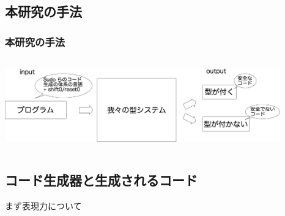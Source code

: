 \subsection{本研究の手法}
\begin{frame}
  \frametitle{本研究の手法}
  \begin{columns}
    \begin{column}{1.\textwidth}%
      \center
      \includegraphics[clip,height=3.2cm]{./img/code_s0r0.png}
    \end{column}
  \end{columns}
\end{frame}



\subsection{コード生成器と生成されるコード}

\begin{frame}
  \center
  \huge{まず表現力について}
\end{frame}

